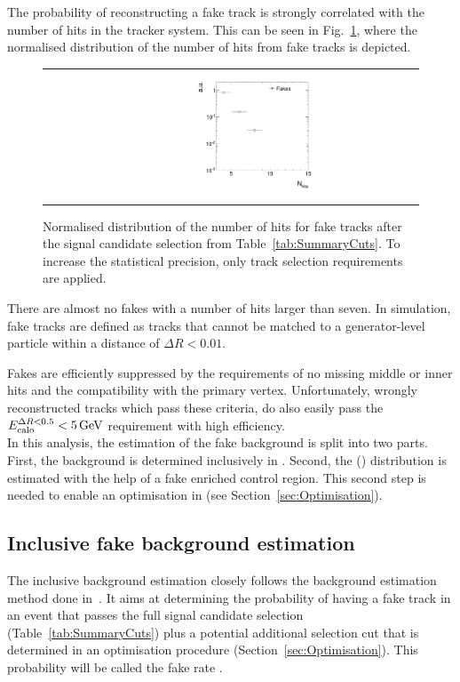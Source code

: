 The probability of reconstructing a fake track is strongly correlated with the number of hits in the tracker system.
This can be seen in Fig.~\ref{fig:NValidFakes}, where the normalised distribution of the number of hits from fake tracks is depicted.
\begin{figure}[!b]
  \centering 
  \begin{tabular}{c}
    \includegraphics[width=0.49\textwidth]{figures/analysis/Background/NValidForFakes_chiTracksfullSelectionNoTriggerCuts.pdf}
  \end{tabular}
  \caption{Normalised distribution of the number of hits for fake tracks after the signal candidate selection from Table~\ref{tab:SummaryCuts}.
           To increase the statistical precision, only track selection requirements are applied.}
  \label{fig:NValidFakes}
\end{figure}
There are almost no fakes with a number of hits larger than seven.
In simulation, fake tracks are defined as tracks that cannot be matched to a generator-level particle within a distance of $\Delta R < 0.01$.

Fakes are efficiently suppressed by the requirements of no missing middle or inner hits and the compatibility with the primary vertex.
Unfortunately, wrongly reconstructed tracks which pass these criteria, do also easily pass the $E^{\Delta R<0.5}_{\text{calo}}<5\,\text{Ge}\kern-0.06667em\text{V}$ requirement with high efficiency.\\

In this analysis, the estimation of the fake background is split into two parts.
First, the background is determined inclusively in \dedx.
Second, the \dedx (\ias) distribution is estimated with the help of a fake enriched control region. 
This second step is needed to enable an optimisation in \dedx (see Section~\ref{sec:Optimisation}).

\subsection*{Inclusive fake background estimation}
The inclusive background estimation closely follows the background estimation method done in~\cite{bib:CMS:DT_Thesis,bib:CMS:DT_8TeV_AN}.
It aims at determining the probability of having a fake track in an event that passes the full signal candidate selection (Table~\ref{tab:SummaryCuts}) plus a potential additional \pt selection cut that is determined in an
optimisation procedure (Section~\ref{sec:Optimisation}).
This probability will be called the fake rate \fakerate.

